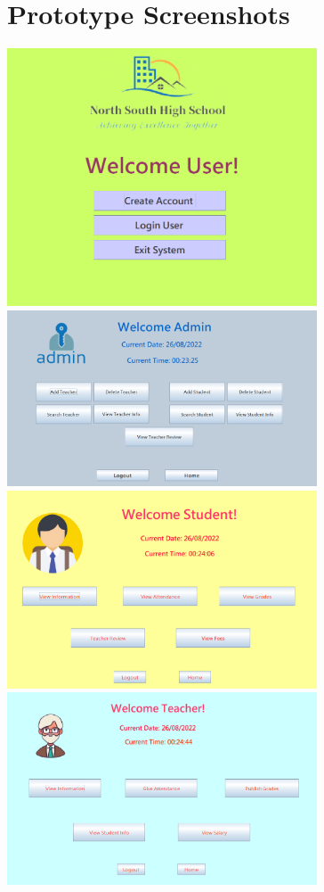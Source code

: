 \documentclass[a4paper,12pt]{article}
\begin{document}
\newpage


\section{Prototype Screenshots}
\enlargethispage{\baselineskip}
\begin{center}
    

\includegraphics[width=9.2cm]{1.png} 
\\
\includegraphics[width=9.2cm]{2.png} 
\\
\includegraphics[width=9.2cm]{3.png} 
\\
\includegraphics[width=9.2cm]{4.png}

\end{center}
\end{document}
